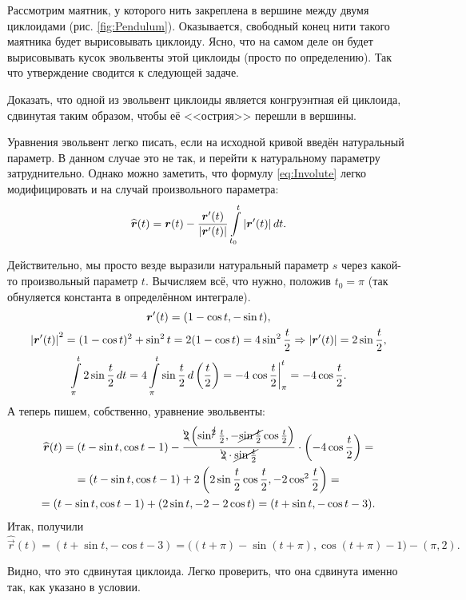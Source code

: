 Рассмотрим маятник, у которого нить закреплена в вершине между двумя циклоидами (рис. \ref{fig:Pendulum}). Оказывается, свободный конец нити такого маятника будет вырисовывать циклоиду. Ясно, что на самом деле он будет вырисовывать кусок эвольвенты этой циклоиды (просто по определению). Так что утверждение сводится к следующей задаче.

\begin{problem}
	Доказать, что одной из эвольвент циклоиды является конгруэнтная ей циклоида, сдвинутая таким образом, чтобы её <<острия>> перешли в вершины.
\end{problem}

\begin{solution}
	Уравнения эвольвент легко писать, если на исходной кривой введён натуральный параметр. В данном случае это не так, и перейти к натуральному параметру затруднительно. Однако можно заметить, что формулу \eqref{eq:Involute} легко модифицировать и на случай произвольного параметра:
	\[
		\widehat{\boldsymbol{r}}(t) = \boldsymbol{r}(t) - \frac{\boldsymbol{r}^\prime(t)}{\left\lvert\boldsymbol{r}^\prime(t)\right\rvert}\int\limits_{t_0}^t\left\lvert\boldsymbol{r}^\prime(t)\right\rvert dt.
	\]

	Действительно, мы просто везде выразили натуральный параметр $s$ через какой-то произвольный параметр $t$. Вычисляем всё, что нужно, положив $t_0 = \pi$ (так обнуляется константа в определённом интеграле).
	\begin{gather*}
		\boldsymbol{r}^\prime(t) = (1 - \cos t, -\sin t),\\
		\left\lvert\boldsymbol{r}^\prime(t)\right\rvert^2 = (1 - \cos t)^2 + \sin^2t = 2(1 - \cos t) = 4\sin^2\frac{t}{2} \Rightarrow \left\lvert\boldsymbol{r}^\prime(t)\right\rvert = 2\sin\frac{t}{2},\\
		\int\limits_\pi^t 2\sin\frac{t}{2}\,dt = 4\int\limits_\pi^t\sin\frac{t}{2}\,d\left(\frac{t}{2}\right) = -4\left.\cos\frac{t}{2}\right|_\pi^t = -4\cos\frac{t}{2}.
	\end{gather*}
	А теперь пишем, собственно, уравнение эвольвенты:
	\begin{multline*}
		\widehat{\boldsymbol{r}}(t) = (t - \sin t, \cos t - 1) - \frac{\bcancel{2}\left(\sin^{\cancel{2}}\frac{t}{2}, -\cancel{\sin\frac{t}{2}}\cos\frac{t}{2}\right)}{\bcancel{2} \cdot \cancel{\sin\frac{t}{2}}} \cdot \left(-4\cos\frac{t}{2}\right) =\\ = (t - \sin t, \cos t - 1) + 2\left(2\sin\frac{t}{2}\cos\frac{t}{2}, -2\cos^2\frac{t}{2}\right) =\\ = (t - \sin t, \cos t - 1) + (2\sin t, -2 - 2\cos t) = (t + \sin t, -\cos t - 3).
	\end{multline*}
	Итак, получили \[\widehat{\vec{r}}(t) = (t + \sin t, -\cos t - 3) = \big((t + \pi) - \sin(t + \pi), \cos(t + \pi) - 1\big) - (\pi, 2).\]

	Видно, что это сдвинутая циклоида. Легко проверить, что она сдвинута именно так, как указано в условии.
\end{solution}

